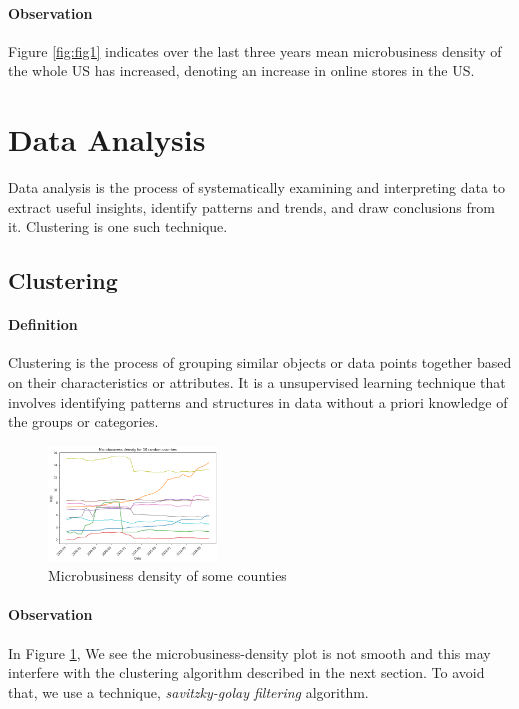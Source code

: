 \documentclass{article}
\begin{document}
\vspace{1em}
\paragraph{Observation}  Figure \ref{fig:fig1}  indicates over the last three years mean microbusiness density of the whole US has increased, denoting an increase in online stores in the US.

\vspace{2em}
\section{\centering Data Analysis}

Data analysis is the process of systematically examining and interpreting data to extract useful insights, identify patterns and trends, and draw conclusions from it. Clustering is one such technique. 

\subsection{Clustering}

\paragraph{Definition} Clustering is the process of grouping similar objects or data points together based on their characteristics or attributes. It is a unsupervised learning technique that involves identifying patterns and structures in data without a priori knowledge of the groups or categories.

\begin{figure}[h]
	\centering
	\includegraphics[width=0.4\textwidth]{images/random10}
	\caption{Microbusiness density of some counties}
	\label{fig:fig2}
\end{figure}

\paragraph{Observation} In Figure \ref{fig:fig2}, We see the microbusiness-density plot is not smooth and this may interfere with the clustering algorithm described in the next section. To avoid that, we use a technique, \textit{savitzky-golay filtering} algorithm.
\end{document}
